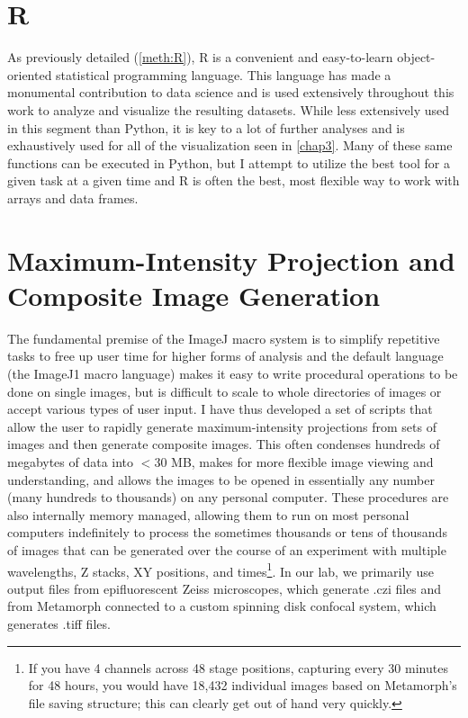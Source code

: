 \section{R}\label{R}

As previously detailed (\autoref{meth:R}), R is a convenient and easy-to-learn object-oriented statistical programming language. This language has made a monumental contribution to data science and is used extensively throughout this work to analyze and visualize the resulting datasets. While less extensively used in this segment than Python, it is key to a lot of further analyses and is exhaustively used for all of the visualization seen in \autoref{chap3}. Many of these same functions can be executed in Python, but I attempt to utilize the best tool for a given task at a given time and R is often the best, most flexible way to work with arrays and data frames.

\section{Maximum-Intensity Projection and Composite Image Generation}\label{mippers}

The fundamental premise of the ImageJ macro system is to simplify repetitive tasks to free up user time for higher forms of analysis and the default language (the ImageJ1 macro language) makes it easy to write procedural operations to be done on single images, but is difficult to scale to whole directories of images or accept various types of user input. I have thus developed a set of scripts that allow the user to rapidly generate maximum-intensity projections from sets of images and then generate composite images. This often condenses hundreds of megabytes of data into $<$30 MB, makes for more flexible image viewing and understanding, and allows the images to be opened in essentially any number (many hundreds to thousands) on any personal computer. These procedures are also internally memory managed, allowing them to run on most personal computers indefinitely to process the sometimes thousands or tens of thousands of images that can be generated over the course of an experiment with multiple wavelengths, Z stacks, XY positions, and times\footnote{If you have 4 channels across 48 stage positions, capturing every 30 minutes for 48 hours, you would have 18,432 individual images based on Metamorph's file saving structure; this can clearly get out of hand very quickly.}. In our lab, we primarily use output files from epifluorescent Zeiss microscopes, which generate .czi files and from Metamorph connected to a custom spinning disk confocal system, which generates .tiff files.

